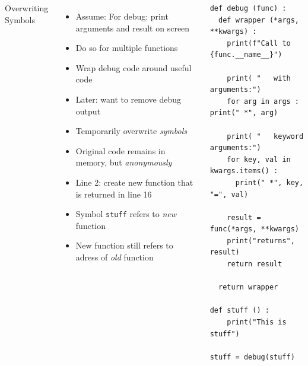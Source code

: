 \begin{frame}[fragile]
%
\begin{columns}[T]
\begin{Large}
	{Overwriting Symbols}
	\vspace{6pt}
\end{Large}
%
\begin{itemize}
\item Assume: For debug: print arguments and result on screen
\item Do so for multiple functions
\item[\Thus] Wrap debug code around useful code
\item Later: want to remove debug output
\item[\Thus] Temporarily overwrite \emph{symbols}
\item Original code remains in memory, but \emph{anonymously}
\item Line 2: create new function that is returned in line 16
\item Symbol \texttt{stuff} refers to \emph{new} function
\item New function still refers to adress of \emph{old} function
\end{itemize}
%
\begin{codebox}
\begin{verbatim}
def debug (func) :
  def wrapper (*args, **kwargs) :
    print(f"Call to {func.__name__}")
    
    print( "   with arguments:")
    for arg in args : print(" *", arg)
    
    print( "   keyword arguments:")
    for key, val in kwargs.items() :
      print(" *", key, "=", val)
    
    result = func(*args, **kwargs)
    print("returns", result)
    return result
        
  return wrapper

def stuff () :
    print("This is stuff")

stuff = debug(stuff)
\end{verbatim}
\end{codebox}
\end{columns}
%
\end{frame}



